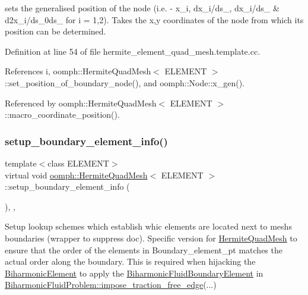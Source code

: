 sets the generalised position of the node (i.\+e. -\/ x\+\_\+i, dx\+\_\+i/ds\+\_, dx\+\_\+i/ds\+\_ \& d2x\+\_\+i/ds\+\_\+0ds\+\_ for i = 1,2). Takes the x,y coordinates of the node from which its position can be determined. 



Definition at line 54 of file hermite\+\_\+element\+\_\+quad\+\_\+mesh.\+template.\+cc.



References i, oomph\+::\+Hermite\+Quad\+Mesh$<$ E\+L\+E\+M\+E\+N\+T $>$\+::set\+\_\+position\+\_\+of\+\_\+boundary\+\_\+node(), and oomph\+::\+Node\+::x\+\_\+gen().



Referenced by oomph\+::\+Hermite\+Quad\+Mesh$<$ E\+L\+E\+M\+E\+N\+T $>$\+::macro\+\_\+coordinate\+\_\+position().

\mbox{\label{classoomph_1_1HermiteQuadMesh_a6eefe872b5bf8a06174b536d9727ea44}} 
\subsubsection{\texorpdfstring{setup\+\_\+boundary\+\_\+element\+\_\+info()}{setup\_boundary\_element\_info()}\hspace{0.1cm}{\footnotesize\ttfamily [1/2]}}
{\footnotesize\ttfamily template$<$class E\+L\+E\+M\+E\+NT$>$ \\
virtual void \hyperlink{classoomph_1_1HermiteQuadMesh}{oomph\+::\+Hermite\+Quad\+Mesh}$<$ E\+L\+E\+M\+E\+NT $>$\+::setup\+\_\+boundary\+\_\+element\+\_\+info (\begin{DoxyParamCaption}{ }\end{DoxyParamCaption})\hspace{0.3cm}{\ttfamily [inline]}, {\ttfamily [private]}, {\ttfamily [virtual]}}

Setup lookup schemes which establish whic elements are located next to mesh\textquotesingle{}s boundaries (wrapper to suppress doc). Specific version for \hyperlink{classoomph_1_1HermiteQuadMesh}{Hermite\+Quad\+Mesh} to ensure that the order of the elements in Boundary\+\_\+element\+\_\+pt matches the actual order along the boundary. This is required when hijacking the \hyperlink{classoomph_1_1BiharmonicElement}{Biharmonic\+Element} to apply the \hyperlink{classoomph_1_1BiharmonicFluidBoundaryElement}{Biharmonic\+Fluid\+Boundary\+Element} in \hyperlink{classoomph_1_1BiharmonicFluidProblem_a1cc57555bbd0ceef1d93010c133ac597}{Biharmonic\+Fluid\+Problem\+::impose\+\_\+traction\+\_\+free\+\_\+edge}(...) 

